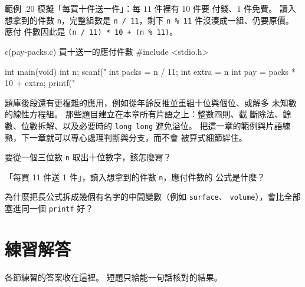 
範例 \thechapter.20 模擬「每買十件送一件」：每 $11$ 件裡有 $10$ 件要
付錢、$1$ 件免費。 讀入想拿到的件數 \texttt{n}，完整組數是
\texttt{n / 11}，剩下 \texttt{n \% 11} 件沒湊成一組、仍要原價。 應付
件數因此是 \texttt{(n / 11) * 10 + (n \% 11)}。

\begin{example}{c}{(pay-packs.c) 買十送一的應付件數}
#include <stdio.h>

int main(void) {
    int n;
    scanf("%
    int packs = n / 11;
    int extra = n %
    int pay = packs * 10 + extra;
    printf("%
}
\end{example}


題庫後段還有更複雜的應用，例如從年齡反推並重組十位與個位、或解多
未知數的線性方程組。 那些題目建立在本章所有片語之上：整數四則、截
斷除法、餘數、位數拆解、以及必要時的 \texttt{long long} 避免溢位。
把這一章的範例與片語練熟，下一章就可以專心處理判斷與分支，而不會
被算式細節絆住。


\begin{drills}[label=drills:arith-synthesis]
\item 要從一個三位數 \texttt{n} 取出十位數字，該怎麼寫？
\item 「每買 11 件送 1 件」，讀入想拿到的件數 \texttt{n}，應付件數的
公式是什麼？
\item 為什麼把長公式拆成幾個有名字的中間變數（例如 \texttt{surface}、
\texttt{volume}），會比全部塞進同一個 \texttt{printf} 好？
\end{drills}

\section*{練習解答}

各節練習的答案收在這裡。 短題只給能一句話核對的結果。

